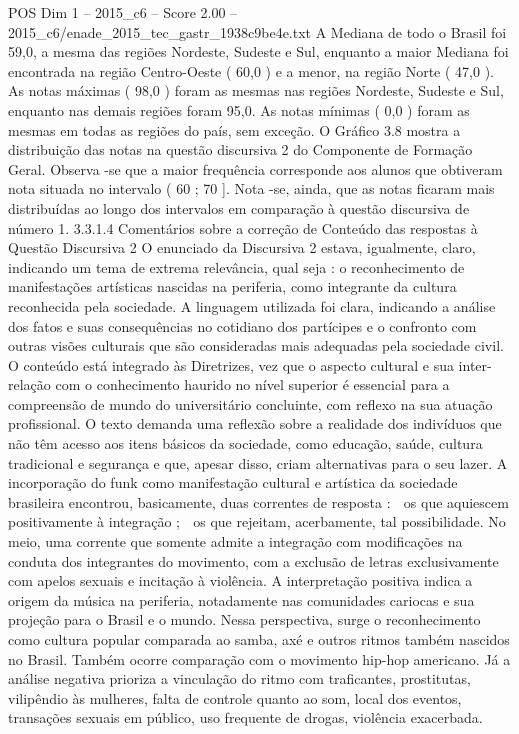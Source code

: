 \begin{textsample}{POS Dim 1 – 2015\_c6 – Score 2.00 – 2015\_c6/enade\_2015\_tec\_gastr\_1938c9be4e.txt}
A Mediana de todo o Brasil foi 59,0, a mesma das regiões Nordeste, Sudeste e Sul, enquanto a maior Mediana foi encontrada na região Centro-Oeste ( 60,0 ) e a menor, na região Norte ( 47,0 ).
As notas máximas ( 98,0 ) foram as mesmas nas regiões Nordeste, Sudeste e Sul, enquanto nas demais regiões foram 95,0.
As notas mínimas ( 0,0 ) foram as mesmas em todas as regiões do país, sem exceção.
O Gráfico 3.8 mostra a distribuição das notas na questão discursiva 2 do Componente de Formação Geral.
Observa -se que a maior frequência corresponde aos alunos que obtiveram nota situada no intervalo ( 60 ; 70 ].
Nota -se, ainda, que as notas ficaram mais distribuídas ao longo dos intervalos em comparação à questão discursiva de número 1. 3.3.1.4 Comentários sobre a correção de Conteúdo das respostas à Questão Discursiva 2 O enunciado da Discursiva 2 estava, igualmente, claro, indicando um tema de extrema relevância, qual seja : o reconhecimento de manifestações artísticas nascidas na periferia, como integrante da cultura reconhecida pela sociedade.
A linguagem utilizada foi clara, indicando a análise dos fatos e suas consequências no cotidiano dos partícipes e o confronto com outras visões culturais que são consideradas mais adequadas pela sociedade civil.
O conteúdo está integrado às Diretrizes, vez que o aspecto cultural e sua inter-relação com o conhecimento haurido no nível superior é essencial para a compreensão de mundo do universitário concluinte, com reflexo na sua atuação profissional.
O texto demanda uma reflexão sobre a realidade dos indivíduos que não têm acesso aos itens básicos da sociedade, como educação, saúde, cultura tradicional e segurança e que, apesar disso, criam alternativas para o seu lazer.
A incorporação do funk como manifestação cultural e artística da sociedade brasileira encontrou, basicamente, duas correntes de resposta :  os que aquiescem positivamente à integração ;  os que rejeitam, acerbamente, tal possibilidade.
No meio, uma corrente que somente admite a integração com modificações na conduta dos integrantes do movimento, com a exclusão de letras exclusivamente com apelos sexuais e incitação à violência.
A interpretação positiva indica a origem da música na periferia, notadamente nas comunidades cariocas e sua projeção para o Brasil e o mundo.
Nessa perspectiva, surge o reconhecimento como cultura popular comparada ao samba, axé e outros ritmos também nascidos no Brasil.
Também ocorre comparação com o movimento hip-hop americano.
Já a análise negativa prioriza a vinculação do ritmo com traficantes, prostitutas, vilipêndio às mulheres, falta de controle quanto ao som, local dos eventos, transações sexuais em público, uso frequente de drogas, violência exacerbada.

\end{textsample}
